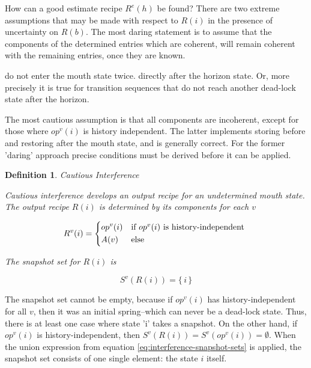 \documentclass[12pt,a4paper]{scrartcl}
\newtheorem{definition}{Definition}
\begin{document}
How can a good estimate recipe $R^e(h)$ be found?  There are two extreme
assumptions that may be made with respect to $R(i)$ in the presence of
uncertainty on $R(b)$. The most daring statement is to assume that the
components of the determined entries which are coherent, will remain coherent
with the remaining entries, once they are known. 

do not enter the mouth state twice. directly after the horizon state. Or, more precisely it is true for
transition sequences that do not reach another dead-lock state after the
horizon.


The most cautious assumption is that all components are
incoherent, except for those where $op^v(i)$ is history independent. The latter
implements storing before and restoring after the mouth state, and is generally
correct.  For the former 'daring' approach precise conditions must be derived
before it can be applied.


\begin{definition} Cautious Interference

Cautious interference develops an output recipe for an undetermined mouth
state. The output recipe $R(i)$ is determined by its components for each $v$
          
\begin{equation} \label{eq:cautious-output-recipe}
    R^v(i) = \begin{dcases*}
              op^v(i) & if $op^v(i)$ is history-independent \\
              A(v)    & else
             \end{dcases*}
\end{equation}

The snapshot set for $R(i)$ is

\begin{equation} \label{eq:cautious-interference-snapshot}
    S^v(R(i)) = \{ \, i \, \}
\end{equation}

\end{definition}

The snapshot set cannot be empty, because if $op^v(i)$ has history-independent
for all $v$, then it was an initial spring--which can never be a dead-lock
state.  Thus, there is at least one case where state 'i' takes a snapshot. On
the other hand, if $op^v(i)$ is history-independent, then
$S^v(R(i))=S^v(op^v(i))=\emptyset$. When the union expression from equation
\eqref{eq:interference-snapshot-sets} is applied, the snapshot set consists of
one single element: the state $i$ itself. 
\end{document}
